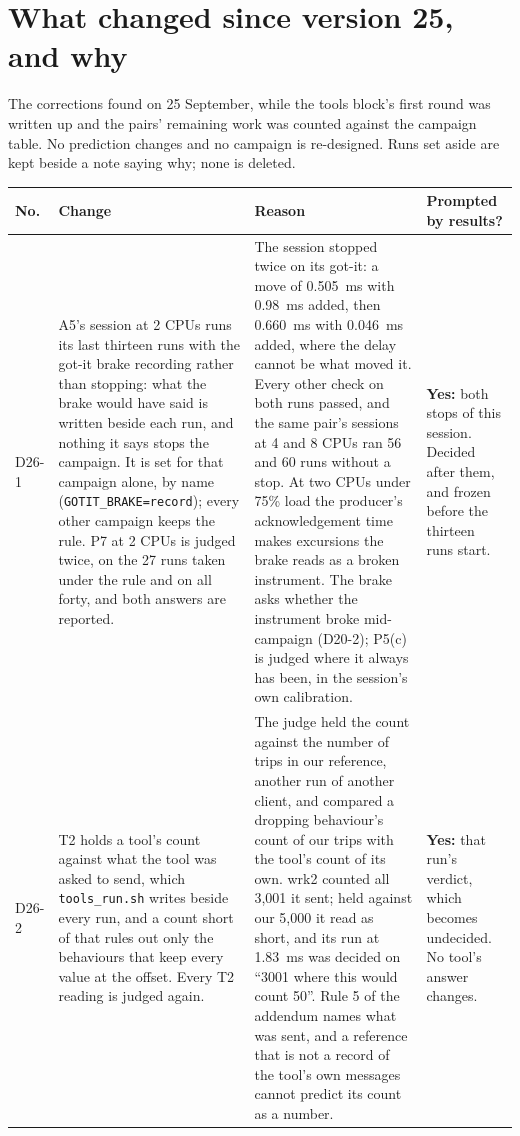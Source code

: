 \documentclass[11pt]{article}
\begin{document}
\section*{What changed since version 25, and why}
The corrections found on 25 September, while the tools block's first round was written up
and the pairs' remaining work was counted against the campaign table. No prediction changes and
no campaign is re-designed. Runs set aside are kept beside a note saying why; none is deleted.

{\small
\begin{longtable}{@{}p{1.1cm} >{\raggedright\arraybackslash}p{6.1cm} >{\raggedright\arraybackslash}p{6.0cm} >{\raggedright\arraybackslash}p{2.2cm}@{}}
\toprule
\textbf{No.} & \textbf{Change} & \textbf{Reason} & \textbf{Prompted by results?} \\
\midrule
\endhead
D26-1 & A5's session at 2 CPUs runs its last thirteen runs with the got-it brake recording rather than stopping: what the brake would have said is written beside each run, and nothing it says stops the campaign. It is set for that campaign alone, by name (\texttt{GOTIT\_BRAKE=record}); every other campaign keeps the rule. P7 at 2 CPUs is judged twice, on the 27 runs taken under the rule and on all forty, and both answers are reported. & The session stopped twice on its got-it: a move of 0.505~ms with 0.98~ms added, then 0.660~ms with 0.046~ms added, where the delay cannot be what moved it. Every other check on both runs passed, and the same pair's sessions at 4 and 8 CPUs ran 56 and 60 runs without a stop. At two CPUs under 75\% load the producer's acknowledgement time makes excursions the brake reads as a broken instrument. The brake asks whether the instrument broke mid-campaign (D20-2); P5(c) is judged where it always has been, in the session's own calibration. & \textbf{Yes:} both stops of this session. Decided after them, and frozen before the thirteen runs start. \\
D26-2 & T2 holds a tool's count against what the tool was asked to send, which \texttt{tools\_run.sh} writes beside every run, and a count short of that rules out only the behaviours that keep every value at the offset. Every T2 reading is judged again. & The judge held the count against the number of trips in our reference, another run of another client, and compared a dropping behaviour's count of our trips with the tool's count of its own. wrk2 counted all 3,001 it sent; held against our 5,000 it read as short, and its run at 1.83~ms was decided on ``3001 where this would count 50''. Rule 5 of the addendum names what was sent, and a reference that is not a record of the tool's own messages cannot predict its count as a number. & \textbf{Yes:} that run's verdict, which becomes undecided. No tool's answer changes. \\

\end{longtable}}
\end{document}
